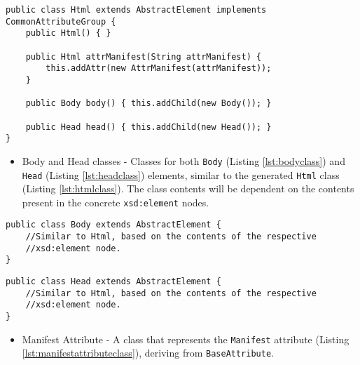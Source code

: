 \newpage


\begin{lstlisting}[caption={Html Element Class},captionpos=b,label={lst:htmlclass}]
public class Html extends AbstractElement implements CommonAttributeGroup {
    public Html() { }
    
    public Html attrManifest(String attrManifest) {
        this.addAttr(new AttrManifest(attrManifest));
    }
    
    public Body body() { this.addChild(new Body()); }
        
    public Head head() { this.addChild(new Head()); }
}
\end{lstlisting}

\begin{itemize}
	\item Body and Head classes - Classes for both \texttt{Body} (Listing \ref{lst:bodyclass}) and \texttt{Head} (Listing \ref{lst:headclass}) elements, similar to the generated \texttt{Html} class (Listing \ref{lst:htmlclass}). The class contents will be dependent on the contents present in the concrete \texttt{xsd:element} nodes.
\end{itemize}

\bigskip

\begin{minipage}{\linewidth}
\begin{lstlisting}[caption={Body Element Class},captionpos=b,label={lst:bodyclass}]
public class Body extends AbstractElement {
    //Similar to Html, based on the contents of the respective
    //xsd:element node.
}
\end{lstlisting}
\end{minipage}

\bigskip

\begin{minipage}{\linewidth}
\begin{lstlisting}[caption={Head Element Class},captionpos=b,label={lst:headclass}]
public class Head extends AbstractElement {
    //Similar to Html, based on the contents of the respective 
    //xsd:element node.
}
\end{lstlisting}
\end{minipage}

\begin{itemize}
	\item Manifest Attribute - A class that represents the \texttt{Manifest} attribute  (Listing \ref{lst:manifestattributeclass}), deriving from \texttt{BaseAttribute}.
\end{itemize}

